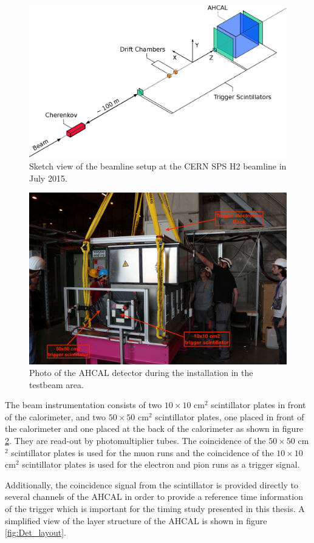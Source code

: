 \begin{figure}[htbp!]
	\centering
	\includegraphics[width=0.7\linewidth]{chap5/fig_EnergyCalib/TestbeamSetup.eps}
	\caption{Sketch view of the beamline setup at the CERN SPS H2 beamline in July 2015.} \label{fig:TestbeamScketch}
\end{figure}

\begin{figure}[htbp!]
	\centering
	\includegraphics[width=0.7\linewidth]{chap5/fig_EnergyCalib/IMG_1170_copy.jpg}
	\caption{Photo of the AHCAL detector during the installation in the testbeam area.} \label{fig:AHCAL_photo}
\end{figure}

The beam instrumentation consists of two $10\times10$ cm$^2$ scintillator plates in front of the calorimeter, and two $50\times50$ cm$^2$ scintillator plates, one placed in front of the calorimeter and one placed at the back of the calorimeter as shown in figure \ref{fig:AHCAL_photo}. They are read-out by photomultiplier tubes. The coincidence of the $50\times50$ cm$^2$ scintillator plates is used for the muon runs and the coincidence of the $10\times10$ cm$^2$ scintillator plates is used for the electron and pion runs as a trigger signal.

Additionally, the coincidence signal from the scintillator is provided directly to several channels of the AHCAL in order to provide a reference time information of the trigger which is important for the timing study presented in this thesis. A simplified view of the layer structure of the AHCAL is shown in figure \ref{fig:Det_layout}.

